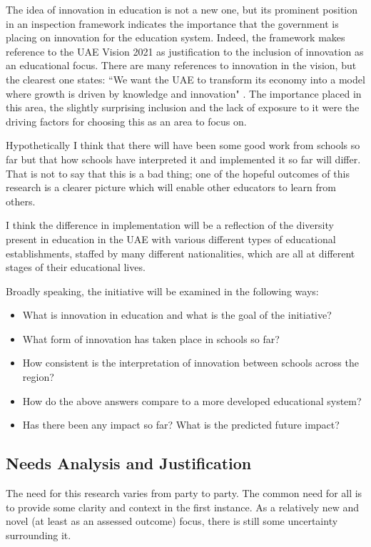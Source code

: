 \documentclass[11pt]{article}
\begin{document}
The idea of innovation in education is not a new one, but its prominent position in an inspection framework indicates the importance that the government is placing on innovation for the education system. Indeed, the framework makes reference to the UAE Vision 2021 as justification to the inclusion of innovation as an educational focus. There are many references to innovation in the vision, but the clearest one states: ``We want the UAE to transform its economy into a model where growth is driven by knowledge and innovation" \citep{UAEGovernment2012}.  The importance placed in this area, the slightly surprising inclusion and the lack of exposure to it were the driving factors for choosing this as an area to focus on.

Hypothetically I think that there will have been some good work from schools so far but that how schools have interpreted it and implemented it so far will differ. That is not to say that this is a bad thing; one of the hopeful outcomes of this research is a clearer picture which will enable other educators to learn from others.

I think the difference in implementation will be a reflection of the diversity present in education in the UAE with various different types of educational establishments, staffed by many different nationalities, which are all at different stages of their educational lives.

Broadly speaking, the initiative will be examined in the following ways: 

\begin{itemize}
	\item What is innovation in education and what is the goal of the initiative?
	\item What form of innovation has taken place in schools so far?
	\item How consistent is the interpretation of innovation between schools across the region?
	\item How do the above answers compare to a more developed educational system?
	\item Has there been any impact so far? What is the predicted future impact?
\end{itemize}

\subsection{Needs Analysis and Justification}

The need for this research varies from party to party. The common need for  all is to provide some clarity and context in the first instance. As a relatively new and novel (at least as an assessed outcome) focus, there is still some uncertainty surrounding it.
\end{document}
